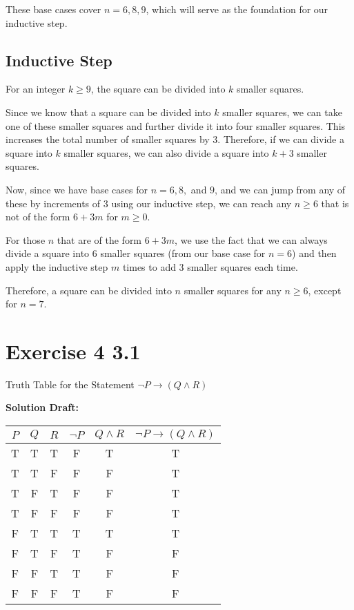 \documentclass{article}
\begin{document}
These base cases cover \( n = 6, 8, 9 \), which will serve as the foundation for our inductive step.

\subsection*{Inductive Step}
For an integer \( k \geq 9 \), the square can be divided into \( k \) smaller squares.

Since we know that a square can be divided into \( k \) smaller squares, we can take one of these smaller squares and further divide it into four smaller squares. This increases the total number of smaller squares by 3. Therefore, if we can divide a square into \( k \) smaller squares, we can also divide a square into \( k+3 \) smaller squares.

Now, since we have base cases for \( n = 6, 8, \) and \( 9 \), and we can jump from any of these by increments of 3 using our inductive step, we can reach any \( n \geq 6 \) that is not of the form \( 6+3m \) for \( m \geq 0 \).

For those \( n \) that are of the form \( 6+3m \), we use the fact that we can always divide a square into 6 smaller squares (from our base case for \( n=6 \)) and then apply the inductive step \( m \) times to add 3 smaller squares each time.

Therefore, a square can be divided into \( n \) smaller squares for any \( n \geq 6 \), except for \( n = 7 \).



\section*{Exercise 4 3.1}  

Truth Table for the Statement \(\neg P \rightarrow (Q \land R)\)

\vspace{0.5cm}
\noindent\textbf{Solution Draft:} 
\vspace{0.2cm}

\begin{tabular}{ccc|c|c|c}
    \(P\) & \(Q\) & \(R\) & \(\neg P\) & \(Q \land R\) & \(\neg P \rightarrow (Q \land R)\) \\
    \hline
    T & T & T & F & T & T \\
    T & T & F & F & F & T \\
    T & F & T & F & F & T \\
    T & F & F & F & F & T \\
    F & T & T & T & T & T \\
    F & T & F & T & F & F \\
    F & F & T & T & F & F \\
    F & F & F & T & F & F \\
    \end{tabular}
\end{document}
